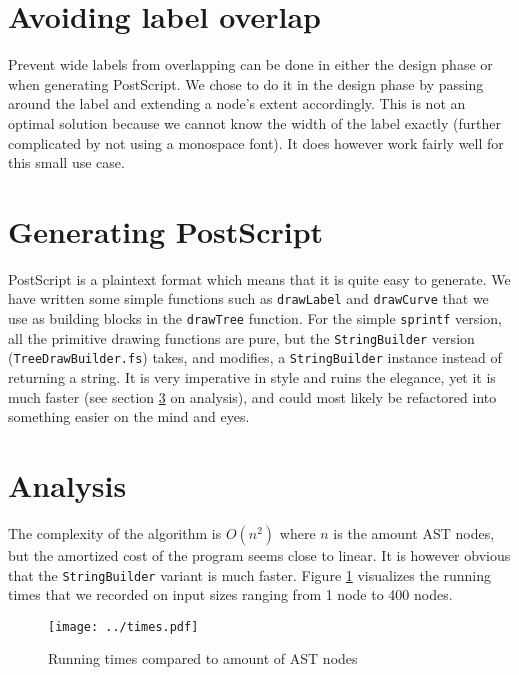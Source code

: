 \documentclass{article}
\begin{document}
\section{Avoiding label overlap}
Prevent wide labels from overlapping can be done in either the design phase or when generating PostScript. We chose to do it in the design phase by passing around the label and extending a node's extent accordingly. This is not an optimal solution because we cannot know the width of the label exactly (further complicated by not using a monospace font). It does however work fairly well for this small use case.


\section{Generating PostScript}
PostScript is a plaintext format which means that it is quite easy to generate. We have written some simple functions such as \texttt{drawLabel} and \texttt{drawCurve} that we use as building blocks in the \texttt{drawTree} function. For the simple \texttt{sprintf} version, all the primitive drawing functions are pure, but the \texttt{StringBuilder} version (\texttt{TreeDrawBuilder.fs}) takes, and modifies, a \texttt{StringBuilder} instance instead of returning a string. It is very imperative in style and ruins the elegance, yet it is much faster (see section \ref{sec:analysis} on analysis), and could most likely be refactored into something easier on the mind and eyes.


\section{Analysis}
\label{sec:analysis}
The complexity of the algorithm is $O(n^2)$ where $n$ is the amount AST nodes, but the amortized cost of the program seems close to linear. It is however obvious that the \texttt{StringBuilder} variant is much faster. Figure \ref{fig:plot} visualizes the running times that we recorded on input sizes ranging from 1 node to 400 nodes.

\begin{figure}[H]
  \centering
  \texttt{[image: ../times.pdf]}
  \caption{Running times compared to amount of AST nodes}
  \label{fig:plot}
\end{figure}
\end{document}
